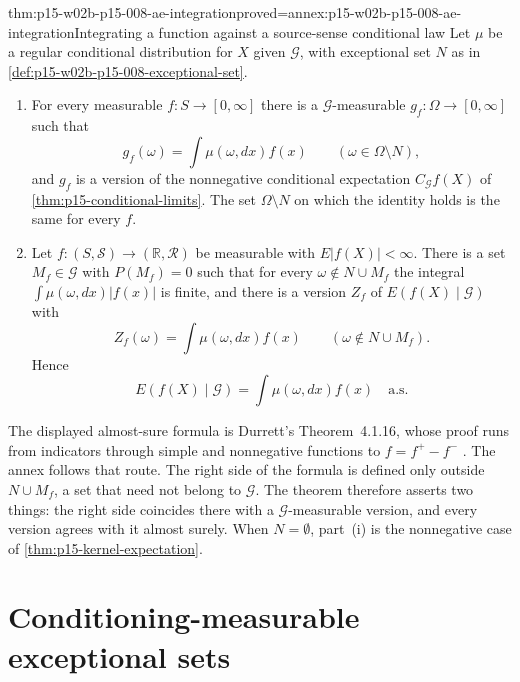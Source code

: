 \begin{hbtheorem}{thm:p15-w02b-p15-008-ae-integration}{proved=annex:p15-w02b-p15-008-ae-integration}{Integrating a function against a source-sense conditional law}
Let \(\mu\) be a regular conditional distribution for \(X\) given
\(\mathcal G\), with exceptional set \(N\) as in
\cref{def:p15-w02b-p15-008-exceptional-set}.
\begin{enumerate}
\item For every measurable \(f:S\to[0,\infty]\) there is a
      \(\mathcal G\)-measurable \(g_f:\Omega\to[0,\infty]\) such that
      \[
           g_f(\omega)=\int\mu(\omega,dx)f(x)
                         \qquad(\omega\in\Omega\setminus N),
      \]
      and \(g_f\) is a version of the nonnegative conditional expectation
      \(C_{\mathcal G}f(X)\) of \cref{thm:p15-conditional-limits}.
      The set \(\Omega\setminus N\) on which the identity holds is the same
      for every \(f\).
\item Let \(f:(S,\mathcal S)\to(\mathbb R,\mathcal R)\) be measurable with
      \(E|f(X)|<\infty\). There is a set \(M_f\in\mathcal G\) with
      \(P(M_f)=0\) such that for every
      \(\omega\notin N\cup M_f\) the integral
      \(\int\mu(\omega,dx)|f(x)|\) is finite, and there is a version
      \(Z_f\) of \(E(f(X)\mid\mathcal G)\) with
      \[
           Z_f(\omega)=\int\mu(\omega,dx)f(x)
                         \qquad(\omega\notin N\cup M_f).
      \]
      Hence
      \[
           E(f(X)\mid\mathcal G)=\int\mu(\omega,dx)f(x)
                                 \quad\text{a.s.}
      \]
\end{enumerate}
\end{hbtheorem}

The displayed almost-sure formula is Durrett's Theorem~4.1.16, whose proof
runs from indicators through simple and nonnegative functions to
\(f=f^+-f^-\) \cite[p.~214]{DurrettPTEAuthor2019}. The annex follows that
route. The right side of the formula is defined only outside
\(N\cup M_f\), a set that need not belong to \(\mathcal G\). The theorem
therefore asserts two things: the right side coincides there with a
\(\mathcal G\)-measurable version, and every version agrees with it almost
surely. When \(N=\emptyset\), part~(i) is the nonnegative case of
\cref{thm:p15-kernel-expectation}.

\section{Conditioning-measurable exceptional sets}
\label{sec:p15-w02b-p15-008-reduction}

